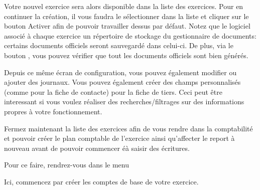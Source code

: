 \documentclass[a4paper,10pt,oneside,french]{sphinxmanual}
\begin{document}
Votre nouvel exercice sera alors disponible dans la
liste des exercices. Pour en continuer la création, il vous faudra le
sélectionner dans la liste et cliquer sur le bouton Activer afin de
pouvoir travailler dessus par défaut.
Notez que le logiciel associé à chaque exercice un répertoire de stockage du gestionnaire de documents: certains documents officiels seront sauvegardé dans celui-ci.
De plus, via le bouton , vous pouvez vérifier que tout les documents officiels sont bien générés.

Depuis ce même écran de configuration, vous pouvez également modifier
ou ajouter des journaux.
Vous pouvez également créer des champs personnalisés (comme pour la fiche de contacte)
pour la fiche de tiers. Ceci peut être interessant si vous voulez réaliser des recherches/filtrages
sur des informations propres à votre fonctionnement.

Fermez maintenant la liste des exercices afin de vous rendre dans la comptabilité et
pouvoir créer le plan comptable de l’exercice ainsi qu’affecter le
report à nouveau avant de pouvoir commencer éà saisir des écritures.

Pour ce faire, rendrez-vous dans le menu 
\begin{quote}

\noindent{}
\end{quote}

Ici, commencez par créer les comptes de base de votre exercice.
\end{document}
